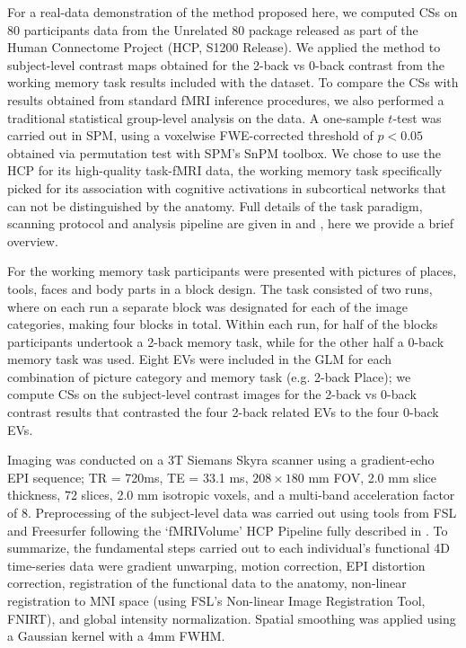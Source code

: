 For a real-data demonstration of the method proposed here, we computed CSs on 80 participants data from the Unrelated 80 package released as part of the Human Connectome Project (HCP, S1200 Release). We applied the method to subject-level contrast maps obtained for the 2-back vs 0-back contrast from the working memory task results included with the dataset. To compare the CSs with results obtained from standard fMRI inference procedures, we also performed a traditional statistical group-level analysis on the data. A one-sample $t$-test was carried out in SPM, using a voxelwise FWE-corrected threshold of $p < 0.05$ obtained via permutation test with SPM's SnPM toolbox. We chose to use the HCP for its high-quality task-fMRI data, the working memory task specifically picked for its association with cognitive activations in subcortical networks that can not be distinguished by the anatomy. Full details of the task paradigm, scanning protocol and analysis pipeline are given in \citet{Barch2013-kk} and \citet{Glasser2013-qc}, here we provide a brief overview. 

For the working memory task participants were presented with pictures of places, tools, faces and body parts in a block design. The task consisted of two runs, where on each run a separate block was designated for each of the image categories, making four blocks in total. Within each run, for half of the blocks participants undertook a 2-back memory task, while for the other half a 0-back memory task was used. Eight EVs were included in the GLM for each combination of picture category and memory task (e.g. 2-back Place); we compute CSs on the subject-level contrast images for the 2-back vs 0-back contrast results that contrasted the four 2-back related EVs to the four 0-back EVs.

Imaging was conducted on a 3T Siemans Skyra scanner using a gradient-echo EPI sequence; TR = 720ms, TE = 33.1 ms, $208\times180$ mm FOV, 2.0 mm slice thickness, 72 slices, 2.0 mm isotropic voxels, and a multi-band acceleration factor of 8. Preprocessing of the subject-level data was carried out using tools from FSL and Freesurfer following the `fMRIVolume' HCP Pipeline fully described in \citet{Glasser2013-qc}. To summarize, the fundamental steps carried out to each individual's functional 4D time-series data were gradient unwarping, motion correction, EPI distortion correction, registration of the functional data to the anatomy, non-linear registration to MNI space (using FSL's Non-linear Image Registration Tool, FNIRT), and global intensity normalization. Spatial smoothing was applied using a Gaussian kernel with a 4mm FWHM. 

